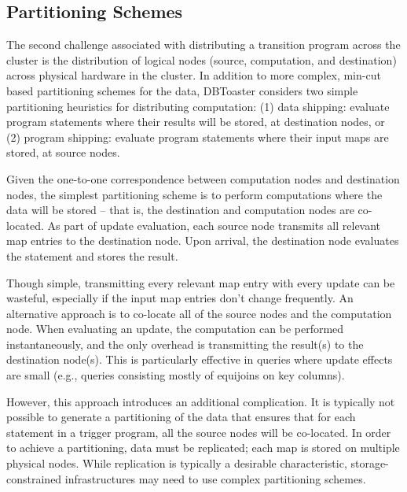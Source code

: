 \subsection{Partitioning Schemes}
The second challenge associated with distributing a transition program across
the cluster is the distribution of logical nodes (source, computation, and
destination) across physical hardware in the cluster.  In addition to more
complex, min-cut based partitioning schemes for the data, DBToaster considers
two simple partitioning heuristics for distributing computation:
(1) data shipping: evaluate program statements where their
results will be stored, at destination nodes, or
(2) program shipping: evaluate program statements where their input maps are
stored, at source nodes.

Given the one-to-one correspondence between computation nodes and destination
nodes, the simplest partitioning scheme is to perform computations where the
data will be stored -- that is, the destination and computation nodes are
co-located.  As part of update evaluation, each source node transmits all
relevant map entries to the destination node.  Upon arrival, the destination
node evaluates the statement and stores the result.

Though simple, transmitting every relevant map entry with every update can be
wasteful, especially if the input map entries don't change frequently.  An
alternative approach is to co-locate all of the source nodes and the computation
node.  When evaluating an update, the computation can be performed
instantaneously, and the only overhead is transmitting the result(s) to the
destination node(s).  This is particularly effective in queries where update
effects are small (e.g., queries consisting mostly of equijoins on key columns).

However, this approach introduces an additional complication.  It is typically
not possible to generate a partitioning of the data that ensures that for each
statement in a trigger program, all the source nodes will be co-located.  In
order to achieve a partitioning, data must be replicated; each map is stored on
multiple physical nodes.  While replication is typically a desirable
characteristic, storage-constrained infrastructures may need to use
complex partitioning schemes.

